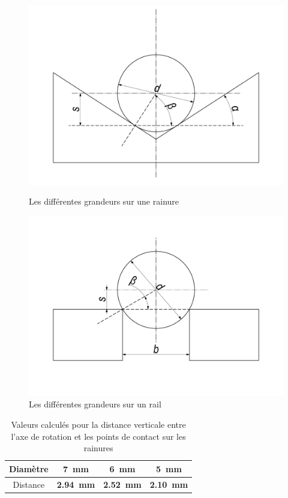 \begin{figure}
    \centering
    \begin{minipage}[c]{0.45\linewidth}
        \centerfloat
        \includegraphics[width=1.25\linewidth]{Graphics/Rails/E_1}
        \caption{Les différentes grandeurs sur une rainure}
        \label{fig:esq_rainures_1}
    \end{minipage}
    \hfill
    \begin{minipage}[c]{0.45\linewidth}
        \centerfloat
        \includegraphics[width=1.25\linewidth]{Graphics/Rails/E_2}
        \caption{Les différentes grandeurs sur un rail}
        \label{fig:esq_rails_1}
    \end{minipage}
\end{figure}

\begin{table}[htbp]
    \centering
    \begin{tabular}{|c|c|c|c|}
        \hline
        Diamètre    & \SI{7}{\mm} & \SI{6}{\mm} & \SI{5}{\mm} \\
        \hline
        Distance    & \textbf{\SI{2.94}{\mm}} & \textbf{\SI{2.52}{\mm}} & \textbf{\SI{2.10}{\mm}} \\
        \hline
    \end{tabular}
    \caption{Valeurs calculés pour la distance verticale entre l'axe de rotation et les points de contact sur les rainures}
    \label{tab:distance_rainures}
\end{table}

